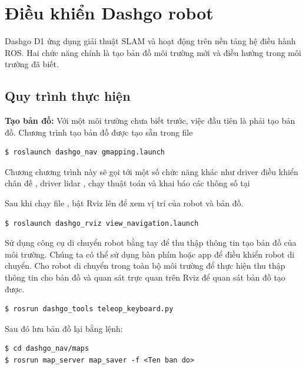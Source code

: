 \section{Điều khiển Dashgo robot}

Dashgo D1 ứng dụng giải thuật SLAM và hoạt động trên nền tảng hệ điều hành ROS.
Hai chức năng chính là tạo bản đồ môi trường mới và điều hướng trong môi trường đã biết.

\subsection{Quy trình thực hiện}

\textbf{Tạo bản đồ:} Với một môi trường chưa biết trước, việc đầu tiên là phải tạo bản đồ.
Chương trình tạo bản đồ được tạo sẵn trong file 

\begin{lstlisting}
$ roslaunch dashgo_nav gmapping.launch
\end{lstlisting}

Chương chương trình này sẽ gọi tới một số chức năng khác như driver điều khiển chân đế , driver lidar , chạy thuật toán và khai báo các thông số tại 

Sau khi chạy file , bật Rviz lên để xem vị trí của robot và bản đồ.
\begin{lstlisting}
$ roslaunch dashgo_rviz view_navigation.launch
\end{lstlisting}


Sử dụng công cụ di chuyển robot bằng tay để thu thập thông tin tạo bản đồ của môi trường. Chúng ta có thể sử dụng bàn phím hoặc app để điều khiển robot di chuyển. Cho robot di chuyển trong toàn bộ môi trường để thực hiện thu thập thông tin cho bản đồ và quan sát trực quan trên Rviz để quan sát bản đồ tạo được.
\begin{lstlisting}
$ rosrun dashgo_tools teleop_keyboard.py
\end{lstlisting}

Sau đó lưu bản đồ lại bằng lệnh:
\begin{lstlisting}
$ cd dashgo_nav/maps
$ rosrun map_server map_saver -f <Ten ban do>
\end{lstlisting}

